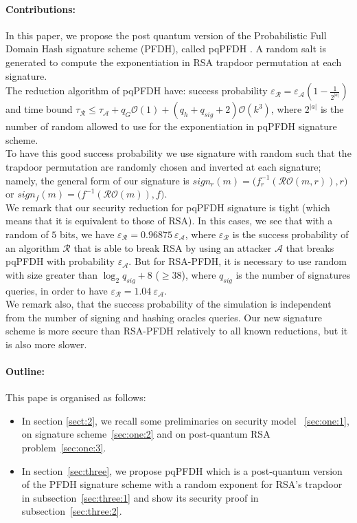 \documentclass[a4paper,11pt]{article}
\begin{document}
\paragraph{Contributions:}
In this paper, we propose the post quantum version of the  Probabilistic Full Domain Hash signature scheme (PFDH), called pqPFDH . A random salt is generated to compute the exponentiation in RSA trapdoor permutation at each signature.\\
The reduction algorithm of pqPFDH have: success probability $\varepsilon_{\mathcal{R}} = \varepsilon_{\mathcal{A}}(1-\frac{1}{2^{|a|}})$ and time bound $\tau_{\mathcal{R}}\leq \tau_{\mathcal{A}} + q_{G}\mathcal{O}(1) + (q_{h}+ q_{sig}+2)\mathcal{O}(k^{3})$, where $2^{|a|}$ is the number of random allowed to use  for the exponentiation in pqPFDH signature scheme.\\
To have this good success probability we use signature with random such that the trapdoor permutation are randomly chosen and inverted at each signature; namely, the general form of our signature is  $sign_{r}(m)=\big(f_{r}^{-1}(\mathcal{RO}(m, r)), r\big)$ or $sign_{f}(m)=\big(f^{-1}(\mathcal{RO}(m)), f\big)$.\\
We remark that our  security reduction for  pqPFDH signature is tight (which means that it is equivalent  to those of RSA). In this cases, we see that with a random of $5$ bits, we have $\varepsilon_{\mathcal{R}}=0.96875 \ \varepsilon_{\mathcal{A}}$, where $\varepsilon_{\mathcal{R}}$  is the success probability of an algorithm $\mathcal{R}$ that is able to break RSA by using an attacker $\mathcal{A}$ that breaks pqPFDH with probability $\varepsilon_{\mathcal{A}}$. But for RSA-PFDH, it is necessary to use  random with size greater than $\log_{2}q_{sig}+8$ ($\geq 38$), where $q_{sig}$ is the number of signatures queries, in order to have $\varepsilon_{\mathcal{R}}=1.04 \ \varepsilon_{\mathcal{A}}$.\\
We remark also, that the success  probability of the simulation is independent from the number of signing and hashing oracles queries. Our new signature scheme is more secure than RSA-PFDH relatively to all known reductions, but it is also more slower.

\paragraph{Outline:} This pape is organised as follows:
\begin{itemize}
\item In section \ref{sect:2}, we recall some preliminaries on security model ~\ref{sec:one:1}, on signature scheme~\ref{sec:one:2} and on post-quantum RSA problem~\ref{sec:one:3}.
\item In section~\ref{sec:three}, we propose pqPFDH which is a post-quantum version of the PFDH signature scheme with a random exponent for RSA's trapdoor in subsection~\ref{sec:three:1} and show its security proof in subsection~\ref{sec:three:2}.
\end{itemize}
\end{document}
